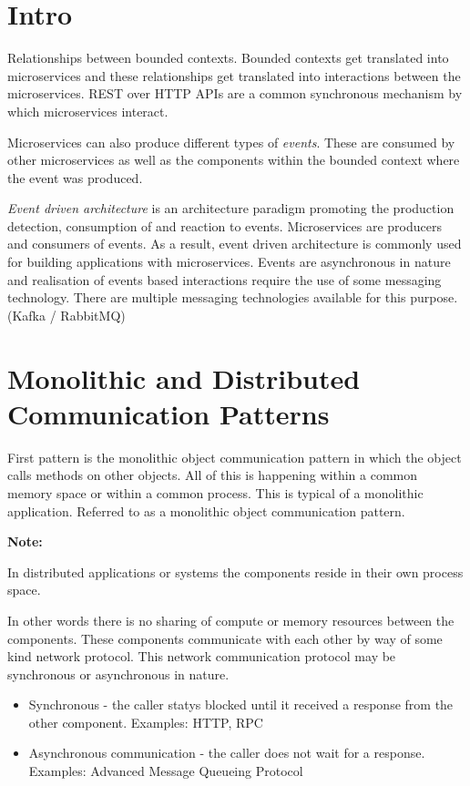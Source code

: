 \documentclass[a4paper, 11pt]{book}
\newenvironment{note}{
    \begin{siderule}
        \textbf{Note: }
        }{
    \end{siderule}
}
\begin{document}
    \section{Intro}
    Relationships between bounded contexts.
    Bounded contexts get translated into microservices and these relationships get translated into interactions between the microservices.
    REST over HTTP APIs are a common synchronous mechanism by which microservices interact.

    Microservices can also produce different types of \textit{events}.
    These are consumed by other microservices as well as the components within the bounded context where the event was produced.

    \textit{Event driven architecture} is an architecture paradigm promoting the production detection, consumption of and reaction to events.
    Microservices are producers and consumers of events.
    As a result, event driven architecture is commonly used for building applications with microservices.
    Events are asynchronous in nature and realisation of events based interactions require the use of some messaging technology.
    There are multiple messaging technologies available for this purpose. (Kafka / RabbitMQ)


    \section{Monolithic and Distributed Communication Patterns}
    First pattern is the monolithic object communication pattern in which the object calls methods on other objects.
    All of this is happening within a common memory space or within a common process.
    This is typical of a monolithic application.
    Referred to as a monolithic object communication pattern.

    \begin{note}
        In distributed applications or systems the components reside in their own process space.
    \end{note}
    In other words there is no sharing of compute or memory resources between the components.
    These components communicate with each other by way of some kind network protocol.
    This network communication protocol may be synchronous or asynchronous in nature.
    \begin{itemize}
        \item Synchronous - the caller statys blocked until it received a response from the other component. Examples: HTTP, RPC
        \item Asynchronous communication - the caller does not wait for a response. Examples: Advanced Message Queueing Protocol
    \end{itemize}
\end{document}
